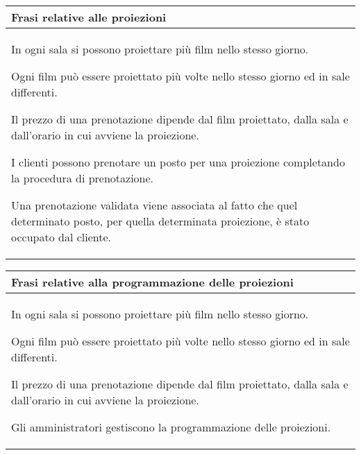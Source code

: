 \begin{tabularx}{\linewidth}{|X|}
    \hline
    \rowcolor{tblhdrcolor}
    \textbf{Frasi relative alle proiezioni} \\\hline
    In ogni sala si possono proiettare più film nello stesso giorno.
    
    Ogni film può essere proiettato più volte nello stesso giorno ed in sale
    differenti.
    
    Il prezzo di una prenotazione dipende dal film proiettato,
    dalla sala e dall'orario in cui avviene la proiezione.
    
    I clienti possono prenotare un posto per una proiezione
    completando la procedura di prenotazione.
    
    Una prenotazione validata viene associata al fatto che quel
    determinato posto, per quella determinata proiezione,
    è stato occupato dal cliente.
    \\ \hline
\end{tabularx}

\begin{tabularx}{\linewidth}{|X|}
    \hline
    \rowcolor{tblhdrcolor}
    \textbf{Frasi relative alla programmazione delle proiezioni} \\\hline

    In ogni sala si possono proiettare più film nello stesso giorno.
    
    Ogni film può essere proiettato più volte nello stesso giorno ed in sale
    differenti.
    
    Il prezzo di una prenotazione dipende dal film proiettato,
    dalla sala e dall'orario in cui avviene la proiezione.
    
    Gli amministratori gestiscono la programmazione delle proiezioni.
    \\ \hline
\end{tabularx}

